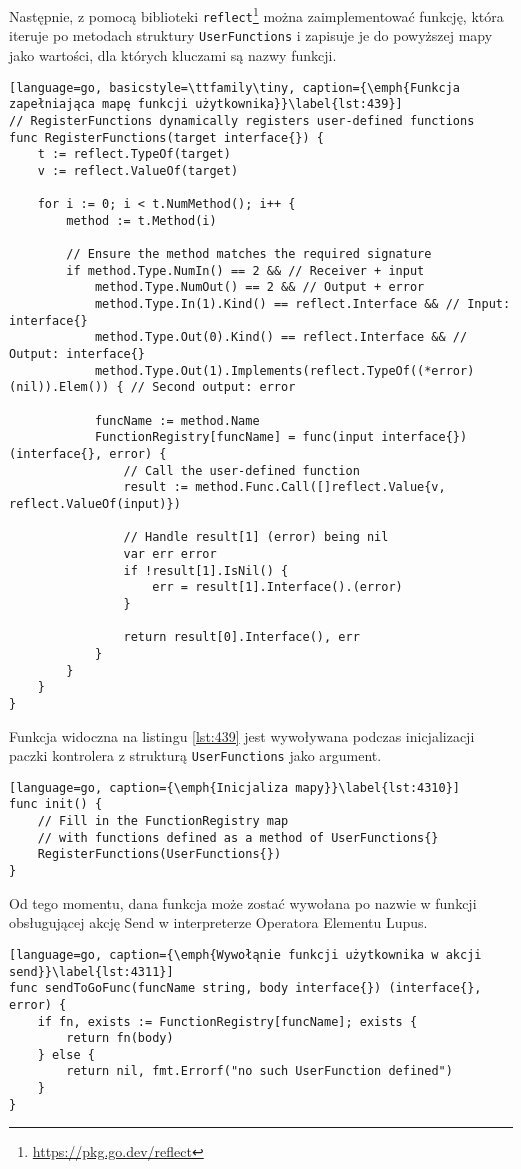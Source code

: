 Następnie, z pomocą biblioteki \texttt{reflect}\footnote{\url{https://pkg.go.dev/reflect}} można zaimplementować funkcję, która iteruje po metodach struktury \texttt{UserFunctions} i zapisuje je do powyższej mapy jako wartości, dla których kluczami są nazwy funkcji. 

\begin{lstlisting}[language=go, basicstyle=\ttfamily\tiny, caption={\emph{Funkcja zapełniająca mapę funkcji użytkownika}}\label{lst:439}]
// RegisterFunctions dynamically registers user-defined functions
func RegisterFunctions(target interface{}) {
	t := reflect.TypeOf(target)
	v := reflect.ValueOf(target)

	for i := 0; i < t.NumMethod(); i++ {
		method := t.Method(i)

		// Ensure the method matches the required signature
		if method.Type.NumIn() == 2 && // Receiver + input
			method.Type.NumOut() == 2 && // Output + error
			method.Type.In(1).Kind() == reflect.Interface && // Input: interface{}
			method.Type.Out(0).Kind() == reflect.Interface && // Output: interface{}
			method.Type.Out(1).Implements(reflect.TypeOf((*error)(nil)).Elem()) { // Second output: error

			funcName := method.Name
			FunctionRegistry[funcName] = func(input interface{}) (interface{}, error) {
				// Call the user-defined function
				result := method.Func.Call([]reflect.Value{v, reflect.ValueOf(input)})

				// Handle result[1] (error) being nil
				var err error
				if !result[1].IsNil() {
					err = result[1].Interface().(error)
				}

				return result[0].Interface(), err
			}
		}
	}
}
\end{lstlisting}

Funkcja widoczna na listingu \ref{lst:439} jest wywoływana podczas inicjalizacji paczki kontrolera z strukturą \texttt{UserFunctions} jako argument.

\begin{lstlisting}[language=go, caption={\emph{Inicjaliza mapy}}\label{lst:4310}]
func init() {
	// Fill in the FunctionRegistry map 
	// with functions defined as a method of UserFunctions{}
	RegisterFunctions(UserFunctions{})
}
\end{lstlisting}


Od tego momentu, dana funkcja może zostać wywołana po nazwie w funkcji obsługującej akcję Send w interpreterze Operatora Elementu Lupus.

\begin{lstlisting}[language=go, caption={\emph{Wywołąnie funkcji użytkownika w akcji send}}\label{lst:4311}]
func sendToGoFunc(funcName string, body interface{}) (interface{}, error) {
	if fn, exists := FunctionRegistry[funcName]; exists {
		return fn(body)
	} else {
		return nil, fmt.Errorf("no such UserFunction defined")
	}
}
\end{lstlisting}

